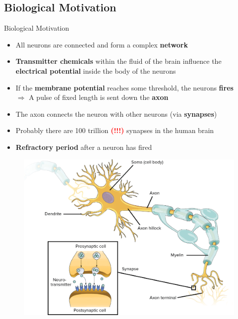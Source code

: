 \subsection{Biological Motivation}

\begin{frame}{Biological Motivation}{}
	\begin{itemize}
		\item All neurons are connected and form a complex \textbf{network}
		\item \textbf{Transmitter chemicals} within the fluid of the brain influence the
			\textbf{electrical potential} inside the body of the neurons
		\item If the \textbf{membrane potential} reaches some threshold, the neurons \textbf{fires} \\
			$\Rightarrow$ A pulse of fixed length is sent down the \textbf{axon}
		\item The axon connects the neuron with other neurons (via \textbf{synapses})
		\item Probably there are 100 trillion \textcolor{red}{\textbf{(!!!)}} synapses in the human brain
		\item \textbf{Refractory period} after a neuron has fired
	\end{itemize}
\end{frame}


\begin{frame}[plain]{}{}
	\begin{figure}
		\centering
		\includegraphics[scale=0.50]{10_deep_learning/02_img/biological_neuron}
	\end{figure}
\end{frame}


